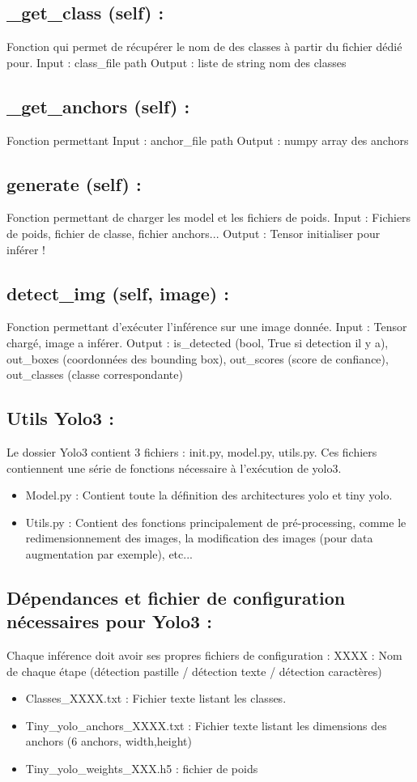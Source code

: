 \subsection{_get_class (self) :}
Fonction qui permet de récupérer le nom de des classes à partir du fichier dédié pour.
Input : class_file path
Output : liste de string nom des classes

\subsection{_get_anchors (self) :}
Fonction permettant
Input : anchor_file path
Output : numpy array des anchors

\subsection{generate (self) :}
Fonction permettant de charger les model et les fichiers de poids.
Input : Fichiers de poids, fichier de classe, fichier anchors...
Output : Tensor initialiser pour inférer !

\subsection{detect_img (self, image) :}
Fonction permettant d’exécuter l’inférence sur une image donnée.
Input : Tensor chargé, image a inférer.
Output : is_detected (bool, True si detection il y a), out_boxes (coordonnées des bounding box), out_scores (score de confiance), out_classes (classe correspondante)

\subsection{Utils Yolo3 :}
Le dossier Yolo3 contient 3 fichiers : init.py, model.py, utils.py. Ces fichiers contiennent une série de fonctions nécessaire à l’exécution de yolo3.
\begin{itemize}
    \item Model.py : Contient toute la définition des architectures yolo et tiny yolo.
    \item Utils.py : Contient des fonctions principalement de pré-processing, comme le redimensionnement des images, la modification des images (pour data augmentation par exemple), etc...
\end{itemize}

\subsection{Dépendances et fichier de configuration nécessaires pour Yolo3 :}
Chaque inférence doit avoir ses propres fichiers de configuration :
XXXX : Nom de chaque étape (détection pastille / détection texte / détection caractères)
\begin{itemize}
    \item Classes_XXXX.txt : Fichier texte listant les classes.
    \item Tiny_yolo_anchors_XXXX.txt : Fichier texte listant les dimensions des anchors (6 anchors, width,height)
    \item Tiny_yolo_weights_XXX.h5 : fichier de poids
\end{itemize}

